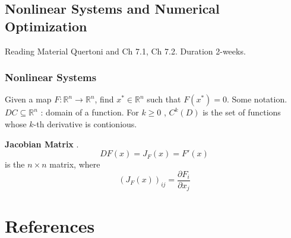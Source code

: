 \documentclass{article}
\theoremstyle{remark}
\newcommand{\newpara}
  {
  \vskip 0.4cm
  }
\begin{document}
\subsection{ Nonlinear Systems and Numerical Optimization}%
\label{sub:_nonlinear_systems_and_numerical_optimization}

Reading Material Quertoni and Ch 7.1, Ch 7.2.  Duration 2-weeks. 
\subsubsection{Nonlinear Systems}%
\label{ssub:nonlinear_systems}

Given a map $F: \mathbb{R} ^{n} \to \mathbb{R} ^{n}$, find $x ^{*} \in \mathbb{R} ^{n}$ such that $F\left( x^{*} \right) = 0$. Some notation. $D C \subseteq  \mathbb{R} ^{n} $ : domain of a function. For $ k\ge 0$ , $C^{k} \left( D \right) $ is the set of functions whose $k$-th derivative is  contionious. 

\newpara
\textbf{Jacobian Matrix} . \[
D F\left( x \right) = J_{F}\left( x \right) = F'  \left( x \right) 
\] 
is the $ n \times  n $ matrix, where \[
\left( J_{F}\left( x \right) \right)_{ij} = \frac{\partial F_{i}}{\partial x_{j}} 
\] 



 

\newpage


\section{References}%
\label{sec:references}



  



\end{document}
